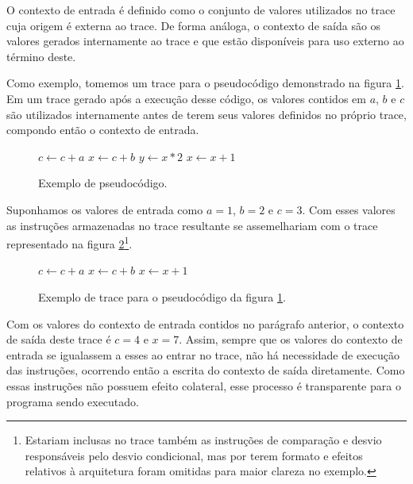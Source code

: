 O contexto de entrada é definido como o conjunto de valores utilizados no trace cuja origem é externa ao trace. De forma análoga, o contexto de saída são os valores gerados internamente ao trace e que estão disponíveis para uso externo ao término deste.

Como exemplo, tomemos um trace para o pseudocódigo demonstrado na figura \ref{Fig:ExemploContexto1}. Em um trace gerado após a execução desse código, os valores contidos em $a$, $b$ e $c$ são utilizados internamente antes de terem seus valores definidos no próprio trace, compondo então o contexto de entrada.

\begin{figure}[!h]
	\label{Fig:ExemploContexto1}
	\caption[Exemplo de pseudocódigo]{
		Exemplo de pseudocódigo.}
	
		\begin{algorithmic}
			\STATE $c \leftarrow c + a$
			\STATE $x \leftarrow c + b$
			\STATE $y \leftarrow x * 2$
			\ELSE
			\STATE $x \leftarrow x + 1$
			\ENDIF
		\end{algorithmic}
	\legend{Fonte: elaborada pelo autor}
\end{figure}

Suponhamos os valores de entrada como $a = 1$, $b = 2$ e $c = 3$. Com esses valores as instruções armazenadas no trace resultante se assemelhariam com o trace representado na figura \ref{Fig:ExemploContexto2}\footnote{Estariam inclusas no trace também as instruções de comparação e desvio responsáveis pelo desvio condicional, mas por terem formato e efeitos relativos à arquitetura foram omitidas para maior clareza no exemplo.}. 

\begin{figure}[!h]
	\label{Fig:ExemploContexto2}
	\caption[Exemplo de trace para o pseudocódigo da figura \ref{Fig:ExemploContexto1}]{
		Exemplo de trace para o pseudocódigo da figura \ref{Fig:ExemploContexto1}.}
	
	\begin{algorithmic}
		\STATE $c \leftarrow c + a$
		\STATE $x \leftarrow c + b$
		\STATE $x \leftarrow x + 1$
	\end{algorithmic}
\end{figure}

Com os valores do contexto de entrada contidos no parágrafo anterior, o contexto de saída deste trace é $c = 4$ e $x = 7$. Assim, sempre que os valores do contexto de entrada se igualassem a esses ao entrar no trace, não há necessidade de execução das instruções, ocorrendo então a escrita do contexto de saída diretamente. Como essas instruções não possuem efeito colateral, esse processo é transparente para o programa sendo executado.

